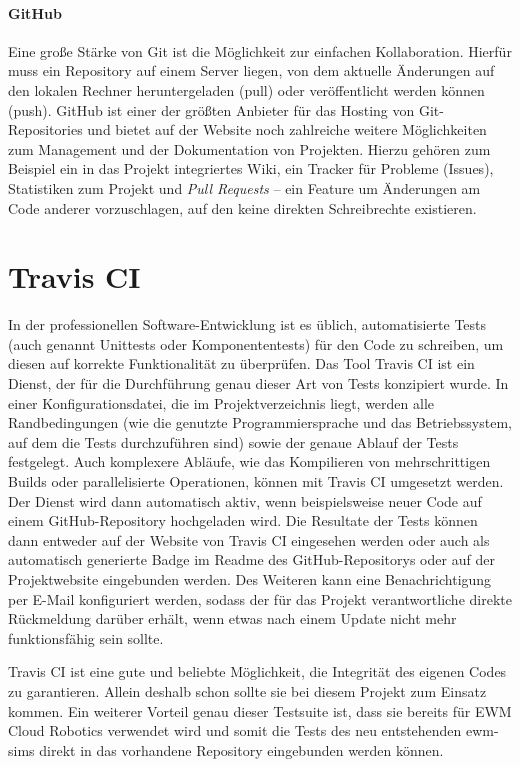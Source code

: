 \paragraph{GitHub}
Eine große Stärke von Git ist die Möglichkeit zur einfachen Kollaboration.
Hierfür muss ein Repository auf einem Server liegen, von dem aktuelle Änderungen auf den lokalen Rechner heruntergeladen (pull) oder veröffentlicht werden können (push).
GitHub ist einer der größten Anbieter für das Hosting von Git-Repositories und bietet auf der Website noch zahlreiche weitere Möglichkeiten zum Management und der Dokumentation von Projekten.
Hierzu gehören zum Beispiel ein in das Projekt integriertes Wiki, ein Tracker für Probleme (Issues), Statistiken zum Projekt und \emph{Pull Requests} -- ein Feature um Änderungen am Code anderer vorzuschlagen, auf den keine direkten Schreibrechte existieren.

\section{Travis CI}
In der professionellen Software-Entwicklung ist es üblich, automatisierte Tests (auch genannt Unittests oder Komponententests) für den Code zu schreiben, um diesen auf korrekte Funktionalität zu überprüfen.
Das Tool Travis CI ist ein Dienst, der für die Durchführung genau dieser Art von Tests konzipiert wurde.
In einer Konfigurationsdatei, die im Projektverzeichnis liegt, werden alle Randbedingungen (wie die genutzte Programmiersprache und das Betriebssystem, auf dem die Tests durchzuführen sind) sowie der genaue Ablauf der Tests festgelegt.
Auch komplexere Abläufe, wie das Kompilieren von mehrschrittigen Builds oder parallelisierte Operationen, können mit Travis CI umgesetzt werden.
Der Dienst wird dann automatisch aktiv, wenn beispielsweise neuer Code auf einem GitHub-Repository hochgeladen wird.
Die Resultate der Tests können dann entweder auf der Website von Travis CI eingesehen werden oder auch als automatisch generierte Badge im Readme des GitHub-Repositorys oder auf der Projektwebsite eingebunden werden.
Des Weiteren kann eine Benachrichtigung per E-Mail konfiguriert werden, sodass der für das Projekt verantwortliche direkte Rückmeldung darüber erhält, wenn etwas nach einem Update nicht mehr funktionsfähig sein sollte.

Travis CI ist eine gute und beliebte Möglichkeit, die Integrität des eigenen Codes zu garantieren.
Allein deshalb schon sollte sie bei diesem Projekt zum Einsatz kommen.
Ein weiterer Vorteil genau dieser Testsuite ist, dass sie bereits für \ac{EWM} Cloud Robotics verwendet wird und somit die Tests des neu entstehenden \ac{ewm-sim}s direkt in das vorhandene Repository eingebunden werden können.

